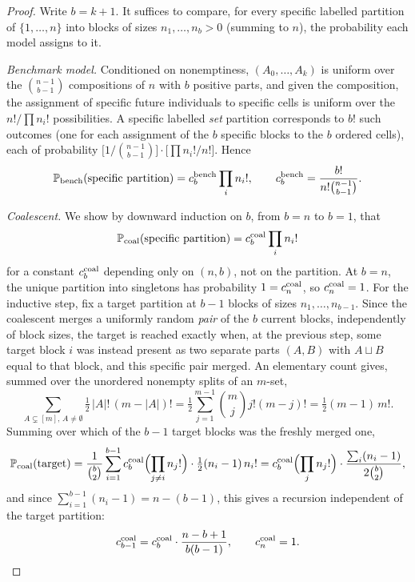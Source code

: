 \documentclass[11pt]{article}
\newcommand{\PP}{\mathbb{P}}
\theoremstyle{plain}
\theoremstyle{definition}
\begin{document}
\begin{proof}
Write \(b=k+1\). It suffices to compare, for every specific labelled partition of \(\{1,\ldots,n\}\) into blocks of sizes \(n_1,\ldots,n_b>0\) (summing to \(n\)), the probability each model assigns to it.

\emph{Benchmark model.} Conditioned on nonemptiness, \((A_0,\ldots,A_k)\) is uniform over the \(\binom{n-1}{b-1}\)  compositions of \(n\) with \(b\) positive parts, and given the composition, the assignment of specific future individuals to specific cells is uniform over the \(n!/\prod n_i!\) possibilities. A specific labelled \emph{set} partition corresponds to \(b!\) such outcomes (one for each assignment of the \(b\) specific blocks to the \(b\) ordered cells), each of probability \(\bigl[1/\binom{n-1}{b-1}\bigr]\cdot\bigl[\prod n_i!/n!\bigr]\). Hence
\begin{equation}
\label{eq:cbench}
\PP_{\rm bench}(\text{specific partition})=c_b^{\rm bench}\prod_i n_i!,\qquad
c_b^{\rm bench}=\frac{b!}{n!\binom{n-1}{b-1}}.
\end{equation}

\emph{Coalescent.} We show by downward induction on \(b\), from \(b=n\) to \(b=1\), that 
$$\PP_{\rm coal}(\text{specific partition})=c_b^{\rm coal}\prod_i n_i!$$
for a constant \(c_b^{\rm coal}\) depending only on \((n,b)\), not on the partition. At \(b=n\), the unique partition into singletons has probability \(1=c_n^{\rm coal}\), so \(c_n^{\rm coal}=1\). For the inductive step, fix a target partition at \(b-1\) blocks of sizes \(n_1,\ldots,n_{b-1}\). Since the coalescent merges a uniformly random \emph{pair} of the \(b\) current blocks, independently of block sizes, the target is reached exactly when, at the previous step, some target block \(i\) was instead present as two separate parts \((A,B)\) with \(A\sqcup B\) equal to that block, and this specific pair merged. An elementary count gives, summed over the unordered nonempty splits of an \(m\)-set,
\[
\sum_{A\subsetneq[m],\,A\ne\emptyset}\tfrac12\,|A|!\,(m-|A|)!=\tfrac12\sum_{j=1}^{m-1}\binom mj j!(m-j)!=\tfrac12(m-1)\,m!.
\]
Summing over which of the \(b-1\) target blocks was the freshly merged one,
\[
\PP_{\rm coal}(\text{target})=\frac1{\binom b2}\sum_{i=1}^{b-1}c_b^{\rm coal}\Bigl(\prod_{j\ne i}n_j!\Bigr)\cdot\tfrac12(n_i-1)\,n_i!
=c_b^{\rm coal}\Bigl(\prod_jn_j!\Bigr)\cdot\frac{\sum_i(n_i-1)}{2\binom b2},
\]
and since \(\sum_{i=1}^{b-1}(n_i-1)=n-(b-1)\), this gives a recursion independent of the target partition:
\begin{equation}
\label{eq:crecur}
c_{b-1}^{\rm coal}=c_b^{\rm coal}\cdot\frac{n-b+1}{b(b-1)},\qquad c_n^{\rm coal}=1.
\end{equation}


\end{proof}
\end{document}
